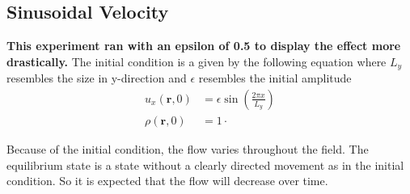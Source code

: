 \subsection{Sinusoidal Velocity}\label{subsec:sinusoidal-velocity}
\textbf{This experiment ran with an epsilon of 0.5 to display the effect more drastically.}
The initial condition is a given by the following equation where $L_y$ resembles the size in y-direction and $\epsilon$ resembles the initial amplitude
\begin{equation*}
    \begin{aligned}
        u_x(\mathbf{r},0) &= \epsilon \sin \left( \frac{2 \pi x}{L_y} \right) \\
        \rho(\mathbf{r},0) &= 1 \cdot
    \end{aligned}
\end{equation*}

Because of the initial condition, the flow varies throughout the field.
The equilibrium state is a state without a clearly directed movement as in the initial condition.
So it is expected that the flow will decrease over time.

